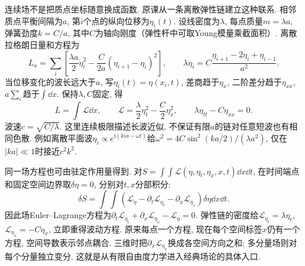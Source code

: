 连续场不是把质点坐标随意换成函数. 原课从一条离散弹性链建立这种联系. 相邻质点平衡间隔为$a$, 第$i$个点的纵向位移为$\eta_i(t)$. 设线密度为$\lambda$, 每点质量$m=\lambda a$, 弹簧劲度$k=C/a$, 其中$C$为轴向刚度（弹性杆中可取Young模量乘截面积）. 离散拉格朗日量和方程为
\[
L_a=\sum_i\left[\frac{\lambda a}{2}\dot\eta_i^2
-\frac{C}{2a}(\eta_{i+1}-\eta_i)^2\right],\qquad
\lambda\ddot\eta_i=C\frac{\eta_{i+1}-2\eta_i+\eta_{i-1}}{a^2}.
\]
当位移变化的波长远大于$a$, 写$\eta_i(t)=\eta(x_i,t)$, 差商趋于$\eta_x$, 二阶差分趋于$\eta_{xx}$, $a\sum_i$趋于$\int\dd x$. 保持$\lambda,C$固定, 得
\[
L=\int\mathscr L\dd x,\qquad
\mathscr L=\frac\lambda2\eta_t^2-\frac C2\eta_x^2,
\qquad \lambda\eta_{tt}-C\eta_{xx}=0.
\]
波速$c=\sqrt{C/\lambda}$. 这里连续极限描述长波近似, 不保证有限$a$的链对任意短波也有相同色散. 例如离散平面波$\eta_i\propto e^{\mathrm i(kia-\omega t)}$给$\omega^2=4C\sin^2(ka/2)/(\lambda a^2)$, 仅在$|ka|\ll1$时接近$c^2k^2$.

同一场方程也可由驻定作用量得到. 对$S=\int\!\int\mathscr L(\eta,\eta_t,\eta_x,x,t)\dd x\dd t$, 在时间端点和固定空间边界取$\delta\eta=0$, 分别对$t,x$分部积分:
\[
\delta S=\int\!\int
\left(\mathscr L_\eta-\partial_t\mathscr L_{\eta_t}
-\partial_x\mathscr L_{\eta_x}\right)\delta\eta\dd x\dd t.
\]
因此场Euler--Lagrange方程为$\partial_t\mathscr L_{\eta_t}+\partial_x\mathscr L_{\eta_x}-\mathscr L_\eta=0$. 弹性链的密度给$\mathscr L_{\eta_t}=\lambda\eta_t$, $\mathscr L_{\eta_x}=-C\eta_x$, 立即重得波动方程. 原来每点一个方程, 现在每个空间标签$x$仍有一个方程, 空间导数表示邻点耦合. 三维时把$\partial_x\mathscr L_{\eta_x}$换成各空间方向之和; 多分量场则对每个分量独立变分. 这就是从有限自由度力学进入经典场论的具体入口.
